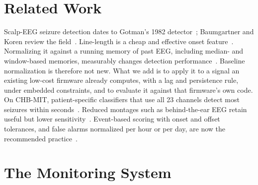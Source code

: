 \documentclass[conference,letterpaper]{IEEEtran}
\begin{document}
\section{Related Work}
Scalp-EEG seizure detection dates to Gotman's 1982 detector~\cite{gotman1982}; Baumgartner and Koren review the field~\cite{baumgartner2018scalp}. Line-length is a cheap and effective onset feature~\cite{esteller2001linelength}. Normalizing it against a running memory of past EEG, including median- and window-based memories, measurably changes detection performance~\cite{logesparan2011norm,logesparan2015norm}. Baseline normalization is therefore not new. What we add is to apply it to a signal an existing low-cost firmware already computes, with a lag and persistence rule, under embedded constraints, and to evaluate it against that firmware's own code. On CHB-MIT, patient-specific classifiers that use all 23 channels detect most seizures within seconds~\cite{shoeb2010icml}. Reduced montages such as behind-the-ear EEG retain useful but lower sensitivity~\cite{gu2018behindear}. Event-based scoring with onset and offset tolerances, and false alarms normalized per hour or per day, are now the recommended practice~\cite{ziyabari2017metrics,dan2025szcore}.

\section{The Monitoring System}\label{sec:system}
\end{document}
